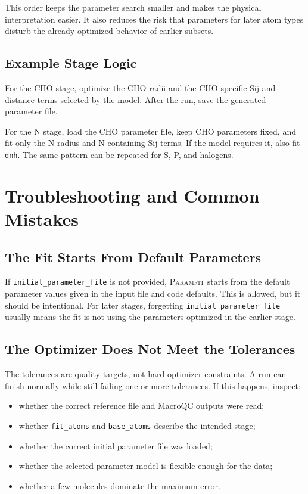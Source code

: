 \documentclass[11pt]{article}
\begin{document}
This order keeps the parameter search smaller and makes the physical
interpretation easier. It also reduces the risk that parameters for later atom
types disturb the already optimized behavior of earlier subsets.

\subsection{Example Stage Logic}

For the CHO stage, optimize the CHO radii and the CHO-specific Sij and distance
terms selected by the model. After the run, save the generated parameter file.

For the N stage, load the CHO parameter file, keep CHO parameters fixed, and fit
only the N radius and N-containing Sij terms. If the model requires it, also fit
\texttt{dnh}. The same pattern can be repeated for S, P, and halogens.

\section{Troubleshooting and Common Mistakes}

\subsection{The Fit Starts From Default Parameters}

If \texttt{initial\_parameter\_file} is not provided, \textsc{Paramfit} starts
from the default parameter values given in the input file and code defaults. This
is allowed, but it should be intentional. For later stages, forgetting
\texttt{initial\_parameter\_file} usually means the fit is not using the
parameters optimized in the earlier stage.

\subsection{The Optimizer Does Not Meet the Tolerances}

The tolerances are quality targets, not hard optimizer constraints. A run can
finish normally while still failing one or more tolerances. If this happens,
inspect:

\begin{itemize}[leftmargin=*]
  \item whether the correct reference file and MacroQC outputs were read;
  \item whether \texttt{fit\_atoms} and \texttt{base\_atoms} describe the intended
        stage;
  \item whether the correct initial parameter file was loaded;
  \item whether the selected parameter model is flexible enough for the data;
  \item whether a few molecules dominate the maximum error.
\end{itemize}
\end{document}
